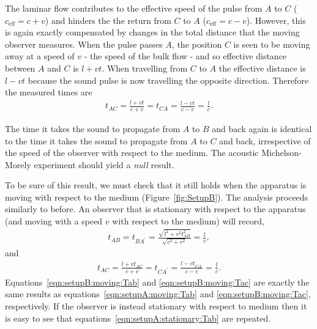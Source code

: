 \documentclass[10pt, fleqn,draft,showtrims,oldfontcommands]{article} %
\newcommand{\figref}[1]{Figure~\ref{fig:#1}}
\newcommand{\eff}{{\textrm{eff}}}
\begin{document}
The laminar flow contributes to the effective speed of the pulse from $A$ to $C$  ($c_\eff = c+v$) 
and hinders the  the return from $C$ to $A$ ($c_\eff = c-v$).
However, this is again exactly compensated by changes in the total distance that the moving observer measures.
When the pulse passes $A$, the position $C$ is seen to be moving away at a speed of $v$ - the speed of the bulk flow - 
and so effective distance between $A$ and $C$ is $l+vt$.  
When travelling from $C$ to $A$ the effective distance is $l-vt$ because the sound pulse is now travelling the opposite direction.
%
Therefore the measured times are
\begin{align}
  \label{eqn:setupA:moving:Tac}
  t_{AC} =  \frac{l+vt}{c+v}= t_{CA} =  \frac{l-vt}{c-v}= \frac{l}{c}.
\end{align}

The time it takes the sound to propagate from $A$ to $B$ and back again is
identical to the time it takes the sound to propagate from $A$ to $C$ and back,
irrespective of the speed of the observer with respect to the medium.
The acoustic Michelson-Morely experiment should yield a  {\em null} result.

To be sure of this result, we must check that it still holds when the apparatus is moving with respect to the medium (\figref{SetupB}).
The analysis  proceeds similarly to before.
An observer that is stationary with respect to the apparatus (and moving with a speed $v$ with respect to the medium) will record,
\begin{align}
  \label{eqn:setupB:moving:Tab}
  t_{AB} = t_{BA^\prime} =  \frac{\sqrt{l^2+v^2t_{AB}^2}}{\sqrt{c^2 +v^2}} = \frac{l}{c},
\end{align}
and 
\begin{align}
  \label{eqn:setupB:moving:Tac}
  t_{AC} =  \frac{l+vt_{AC}}{c+v}= t_{CA^\prime} =  \frac{l-vt_{CA^\prime}}{c-v}= \frac{l}{c}.
\end{align}
Equations~\ref{eqn:setupB:moving:Tab} and \ref{eqn:setupB:moving:Tac}  are exactly the same results as equations~\ref{eqn:setupA:moving:Tab} and \ref{eqn:setupB:moving:Tac},
respectively.
If the observer is instead stationary with respect to medium then it is easy to see that equations~\ref{eqn:setupA:stationary:Tab}  are repeated.
\end{document}
